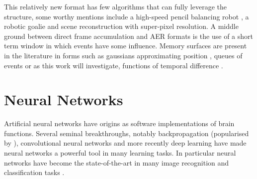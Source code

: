 This relatively new format has few algorithms that can fully leverage the structure, some worthy mentions include a high-speed pencil balancing robot \cite{conradt2009pencil}, a robotic goalie \cite{roboGoalie2013} and scene reconstruction with super-pixel resolution\cite{kim2008simultaneous}.
A middle ground between direct frame accumulation and AER formats is the use of a short term window in which events have some influence.
Memory surfaces are present in the literature in forms such as gaussians approximating position \cite{conradt2009pencil}, queues of events \cite{ni2012asynchronous} or as this work will investigate, functions of temporal difference \cite{afshar2016investigation}.


% 








\section{Neural Networks}     %
Artificial neural networks have origins as software implementations of brain functions\cite{mcculloch1943logical}.
Several seminal breakthroughs, notably backpropagation (popularised by \cite{Rumelhart1986}), convolutional neural networks \cite{lecun1998gradient} and more recently deep learning \cite{schmidhuber2015deep} have made neural networks a powerful tool in many learning tasks. 
In particular neural networks have become the state-of-the-art in many image recognition and classification tasks \cite{krizhevsky2012imagenet, szegedy2015going}.

